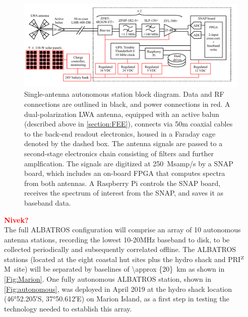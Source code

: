 \documentclass{ws-jai}
\def\prizm{PRI$^{\rm Z}$M}
\newcommand{\attention}[1]{\textcolor{red}{\bf {#1}}}
\begin{document}
\begin{figure}
  \begin{center}
    \includegraphics[width=\linewidth]{Figures/albatros_single_schematic/albatros_single_schematic.pdf}
    \caption{Single-antenna autonomous station block diagram. 
      Data and RF connections are outlined in black, and power
      connections in red.  
      A dual-polarization LWA
      antenna, equipped with an active balun (described above in \ref{section:FEE}), connects via 50m
      coaxial cables to the back-end readout electronics, 
      housed in a Faraday cage denoted by the dashed box. 
      The antenna signals are passed
      to a second-stage electronics chain consisting of filters and further amplfication.  The signals are
      digitized at 250~Msamp/s by a SNAP board, which includes an on-board FPGA that computes spectra from both antennas.  
      A Raspberry Pi controls the SNAP board, receives the spectrum of interest from the SNAP, and saves it as baseband data.}
    \label{Fig:Signal Chain}
  \end{center}
\end{figure}
\attention{Nivek?} \\


The full ALBATROS configuration will comprise an array of 10 autonomous antenna stations, recording the lowest 10-20MHz baseband to disk, to be collected periodically and subsequently correlated offline. The ALBATROS stations (located at the eight coastal hut sites plus the hydro shack and \prizm\ site) will
be separated by baselines of \SI{\approx {20}}{km} as shown in
\autoref{Fig:Marion}. One fully autonomous ALBATROS
station, shown in \autoref{Fig:autonomous}, was deployed in April 2019 at the hydro shack location (\ang{46;52.205;}S, \ang{37;50.612;}E) on Marion Island, as a first step in testing the technology needed to establish this array.


\end{document}
